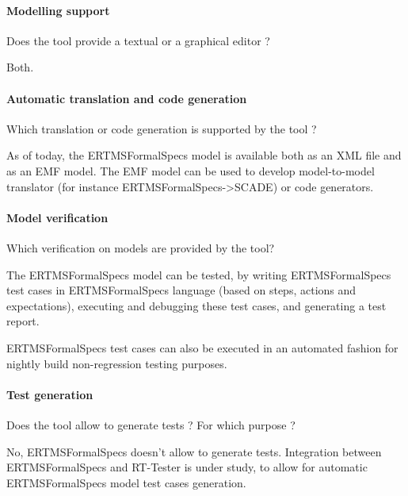 \paragraph{Modelling support}
Does the tool provide a  textual or a graphical editor ?

\begin{author_comment}
Both.
\end{author_comment}

\paragraph{Automatic translation and code generation}
Which translation or code generation is supported by the tool ?

\begin{author_comment}
As of today, the ERTMSFormalSpecs model is available both as an XML file and as an EMF model. The EMF model can be used to develop model-to-model translator (for instance ERTMSFormalSpecs->SCADE) or code generators.
\end{author_comment}

\paragraph{Model verification}
Which verification on models are provided by the tool?

\begin{author_comment}
The ERTMSFormalSpecs model can be tested, by writing ERTMSFormalSpecs test cases in ERTMSFormalSpecs language (based on steps, actions and expectations), executing and debugging these test cases, and generating a test report. 

ERTMSFormalSpecs test cases can also be executed in an automated fashion for nightly build non-regression testing purposes.
\end{author_comment}

\paragraph{Test generation}
Does the tool allow to generate tests ? For  which purpose ?

\begin{author_comment}
No, ERTMSFormalSpecs doesn't allow to generate tests. Integration between ERTMSFormalSpecs and RT-Tester is under study, to allow for automatic ERTMSFormalSpecs model test cases generation.
\end{author_comment}

